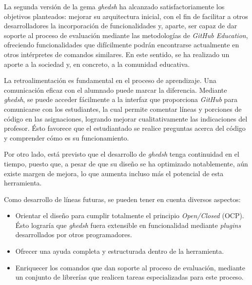 

La segunda versión de la gema {\it ghedsh} ha alcanzado satisfactoriamente los objetivos planteados: mejorar su arquitectura inicial, con el fin de facilitar a otros desarrolladores
la incorporación de funcionalidades y, aparte, ser capaz de dar soporte al proceso de evaluación mediante las metodologías de {\it GitHub Education}, ofreciendo funcionalidades que difícilmente
podrán encontrarse actualmente en otros intérpretes de comandos similares. En este sentido, se ha realizado un aporte a la sociedad y, en concreto, a la comunidad educativa.
\bigskip

La retroalimentación es fundamental en el proceso de aprendizaje. Una comunicación eficaz con el alumnado puede marcar la diferencia. Mediante {\it ghedsh}, se puede acceder fácilmente a la interfaz que proporciona {\it GitHub} para comunicarse con los estudiantes, la cual permite comentar líneas y porciones de código en las asignaciones, logrando
mejorar cualitativamente las indicaciones del profesor. Ésto favorece que el estudiantado se realice preguntas acerca del código y comprender cómo es su funcionamiento.
\bigskip

Por otro lado, está previsto que el desarrollo de {\it ghedsh} tenga continuidad en el tiempo, puesto que, a pesar de que su diseño se ha optimizado notablemente, aún existe margen de mejora, lo que aumenta incluso más el potencial de esta herramienta.
\bigskip

Como desarrollo de líneas futuras, se pueden tener en cuenta diversos aspectos:
\begin{itemize}
	\item Orientar el diseño para cumplir totalmente el principio {\it Open/Closed} (OCP). Ésto lograría que {\it ghedsh} fuera extensible en funcionalidad mediante {\it plugins} desarrollados por otros programadores.
	\item Ofrecer una ayuda completa y estructurada dentro de la herramienta.
	\item Enriquecer los comandos que dan soporte al proceso de evaluación, mediante un conjunto de librerías que realicen tareas especializadas para este proceso.
\end{itemize}



